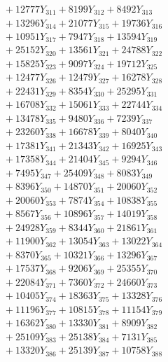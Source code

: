 \documentclass[a4paper,10pt]{article}
\begin{document}
{\begin{align}
&\;  + 12777 Y_{311} + 8199 Y_{312} + 8492 Y_{313} \\[0.3ex]
&\;  + 13296 Y_{314} + 21077 Y_{315} + 19736 Y_{316} \\[0.3ex]
&\;  + 10951 Y_{317} + 7947 Y_{318} + 13594 Y_{319} \\[0.3ex]
&\;  + 25152 Y_{320} + 13561 Y_{321} + 24788 Y_{322} \\[0.3ex]
&\;  + 15825 Y_{323} + 9097 Y_{324} + 19712 Y_{325} \\[0.3ex]
&\;  + 12477 Y_{326} + 12479 Y_{327} + 16278 Y_{328} \\[0.5ex]\allowbreak
&\;  + 22431 Y_{329} + 8354 Y_{330} + 25295 Y_{331} \\[0.3ex]
&\;  + 16708 Y_{332} + 15061 Y_{333} + 22744 Y_{334} \\[0.3ex]
&\;  + 13478 Y_{335} + 9480 Y_{336} + 7239 Y_{337} \\[0.3ex]
&\;  + 23260 Y_{338} + 16678 Y_{339} + 8040 Y_{340} \\[0.3ex]
&\;  + 17381 Y_{341} + 21343 Y_{342} + 16925 Y_{343} \\[0.3ex]
&\;  + 17358 Y_{344} + 21404 Y_{345} + 9294 Y_{346} \\[0.3ex]
&\;  + 7495 Y_{347} + 25409 Y_{348} + 8083 Y_{349} \\[0.3ex]
&\;  + 8396 Y_{350} + 14870 Y_{351} + 20060 Y_{352} \\[0.3ex]
&\;  + 20060 Y_{353} + 7874 Y_{354} + 10838 Y_{355} \\[0.3ex]
&\;  + 8567 Y_{356} + 10896 Y_{357} + 14019 Y_{358} \\[0.5ex]\allowbreak
&\;  + 24928 Y_{359} + 8344 Y_{360} + 21861 Y_{361} \\[0.3ex]
&\;  + 11900 Y_{362} + 13054 Y_{363} + 13022 Y_{364} \\[0.3ex]
&\;  + 8370 Y_{365} + 10321 Y_{366} + 13296 Y_{367} \\[0.3ex]
&\;  + 17537 Y_{368} + 9206 Y_{369} + 25355 Y_{370} \\[0.3ex]
&\;  + 22084 Y_{371} + 7360 Y_{372} + 24660 Y_{373} \\[0.3ex]
&\;  + 10405 Y_{374} + 18363 Y_{375} + 13328 Y_{376} \\[0.3ex]
&\;  + 11196 Y_{377} + 10815 Y_{378} + 11154 Y_{379} \\[0.3ex]
&\;  + 16362 Y_{380} + 13330 Y_{381} + 8909 Y_{382} \\[0.3ex]
&\;  + 25109 Y_{383} + 25138 Y_{384} + 7131 Y_{385} \\[0.3ex]
&\;  + 13320 Y_{386} + 25139 Y_{387} + 10758 Y_{388} \\[0.5ex]\allowbreak

\end{align}}
\end{document}
